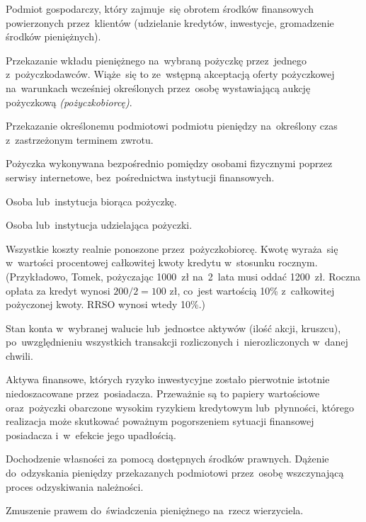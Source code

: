\documentclass[a4paper,twoside,titlepage,openright]{book}
\begin{document}
\begin{description}[style=nextline]
	\item[Instytucja finansowa] Podmiot gospodarczy, który zajmuje~się obrotem środków finansowych powierzonych przez~klientów (udzielanie kredytów, inwestycje, gromadzenie środków pieniężnych).
	\item[Oferta inwestycyjna] Przekazanie wkładu pieniężnego na~wybraną pożyczkę przez~jednego z~pożyczkodawców. Wiąże~się to ze~wstępną akceptacją oferty pożyczkowej na~warunkach wcześniej określonych przez~osobę wystawiającą aukcję pożyczkową \textit{(pożyczkobiorcę)}.
	\item[Pożyczka] Przekazanie określonemu podmiotowi podmiotu pieniędzy na~określony czas z~zastrzeżonym terminem zwrotu. 
	\item[Pożyczka społecznościowa (ang. \textit{social lending})] Pożyczka wykonywana bezpośrednio pomiędzy osobami fizycznymi poprzez serwisy internetowe, bez~pośrednictwa instytucji finansowych.
	\item[Pożyczkobiorca] Osoba lub~instytucja biorąca pożyczkę.\cite{slownikPwn}
	\item[Pożyczkodawca] Osoba lub~instytucja udzielająca pożyczki.\cite{slownikPwn}
	\item[RRSO (Rzeczywista roczna stopa oprocentowania)] Wszystkie koszty realnie ponoszone przez~pożyczkobiorcę. Kwotę wyraża~się w~wartości procentowej całkowitej kwoty kredytu w~stosunku rocznym. (Przykładowo, Tomek, pożyczając 1000~zł na~2~lata musi oddać 1200~zł. Roczna opłata za kredyt wynosi $ 200 / 2 = 100 \text{ zł} $, co~jest wartością 10\% z~całkowitej pożyczonej kwoty. RRSO wynosi wtedy 10\%.)
	\item[Saldo] Stan konta w~wybranej walucie lub~jednostce aktywów (ilość akcji, kruszcu), po~uwzględnieniu wszystkich transakcji rozliczonych i~nierozliczonych w~danej chwili.
	\item[Toksyczne aktywa] Aktywa finansowe, których ryzyko inwestycyjne zostało pierwotnie istotnie niedoszacowane przez~posiadacza. Przeważnie są to papiery wartościowe oraz~pożyczki obarczone wysokim ryzykiem kredytowym lub~płynności, którego realizacja może skutkować poważnym pogorszeniem sytuacji finansowej posiadacza i~w~efekcie jego upadłością.\cite{slownikNBP}
	\item[Windykacja] Dochodzenie własności za pomocą dostępnych środków prawnych. Dążenie do~odzyskania pieniędzy przekazanych podmiotowi przez~osobę wszczynającą proces odzyskiwania należności.
	\item[Zobowiązania] Zmuszenie prawem do~świadczenia pieniężnego na~rzecz wierzyciela.
\end{description}
 
\end{document}

